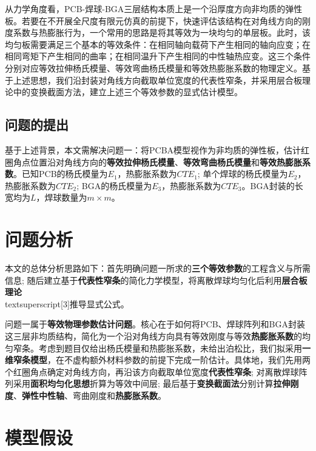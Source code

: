 \documentclass[draft,12pt,a4paper]{ctexart}
\theoremstyle{definition}
\begin{document}
从力学角度看，PCB-焊球-BGA三层结构本质上是一个沿厚度方向非均质的弹性板。若要在不开展全尺度有限元仿真的前提下，快速评估该结构在对角线方向的刚度系数与热膨胀行为，一个常用的思路是将其等效为一块均匀的单层板。此时，该均匀板需要满足三个基本的等效条件：在相同轴向载荷下产生相同的轴向应变；在相同弯矩下产生相同的曲率；在相同温升下产生相同的中性轴热应变。这三个条件分别对应等效拉伸杨氏模量、等效弯曲杨氏模量和等效热膨胀系数的物理定义。基于上述思想，我们沿封装对角线方向截取单位宽度的代表性窄条，并采用层合板理论中的变换截面方法，建立上述三个等效参数的显式估计模型。

\subsection{问题的提出}

基于上述背景，本文需解决问题一：将PCBA模型视作为非均质的弹性板，估计红圈角点位置沿对角线方向的\textbf{等效拉伸杨氏模量}、\textbf{等效弯曲杨氏模量}和\textbf{等效热膨胀系数}。已知PCB的杨氏模量为$E_1$，热膨胀系数为$CTE_1$; 单个焊球的杨氏模量为$E_2$，热膨胀系数为$CTE_2$; BGA的杨氏模量为$E_3$，热膨胀系数为$CTE_3$。BGA封装的长宽均为$L$，焊球数量为$m \times m$。

\newpage
\section{问题分析}

本文的总体分析思路如下：首先明确问题一所求的\textbf{三个等效参数}的工程含义与所需信息; 随后建立基于\textbf{代表性窄条}的简化力学模型，将离散焊球均匀化后利用\textbf{层合板理论}\\textsuperscript{[3]}推导显式公式。

问题一属于\textbf{等效物理参数估计问题}。核心在于如何将PCB、焊球阵列和BGA封装这三层非均质结构，简化为一个沿对角线方向具有等效刚度与等效\textbf{热膨胀系数}的均匀窄条。考虑到题目仅给出杨氏模量和热膨胀系数，未给出泊松比，我们拟采用\textbf{一维窄条模型}，在不虚构额外材料参数的前提下完成一阶估计。具体地，我们先用两个红圈角点确定对角线方向，再沿该方向截取单位宽度\textbf{代表性窄条}; 对离散焊球阵列采用\textbf{面积均匀化思想}折算为等效中间层; 最后基于\textbf{变换截面法}分别计算\textbf{拉伸刚度}、\textbf{弹性中性轴}、弯曲刚度和\textbf{热膨胀系数}。

\newpage
\section{模型假设}
\end{document}
